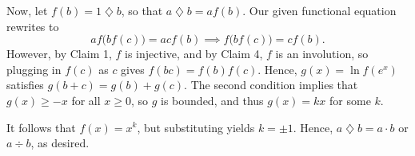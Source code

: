 Now, let $f(b)=1\mathbin{\diamondsuit}b$, so that $a\mathbin{\diamondsuit}b=af(b)$. Our given functional equation rewrites to $$af\big(bf(c)\big)=acf(b)\implies f\big(bf(c)\big)=cf(b).$$
However, by Claim 1, $f$ is injective, and by Claim 4, $f$ is an involution, so plugging in $f(c)$ as $c$ gives $f(bc)=f(b)f(c)$. Hence, $g(x)=\ln f(e^x)$ satisfies $g(b+c)=g(b)+g(c)$. The second condition implies that $g(x)\ge -x$ for all $x\ge 0$, so $g$ is bounded, and thus $g(x)=kx$ for some $k$.

It follows that $f(x)=x^k$, but substituting yields $k=\pm 1$. Hence, $a\mathbin{\diamondsuit}b=a\cdot b$ or $a\div b$, as desired.


